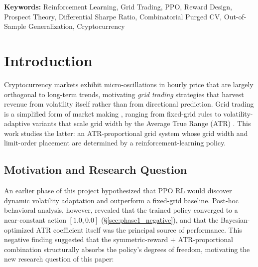 \documentclass[11pt, a4paper]{article}
\begin{document}
\begin{abstract}
Our contribution is twofold. First, we demonstrate quantitatively that reward
design exerts its effect through a \emph{trade-off dimension in risk profile}
rather than a single Sharpe ``alpha source.'' Second, we provide quantitative
evidence that Kahneman-Tversky prospect theory confers OOS safety on
RL trading policies. Code and data:
\url{https://github.com/cosmicpotato2047/capstone-rl-trading}.
\end{abstract}

\vspace{1em}
\noindent\textbf{Keywords:} Reinforcement Learning, Grid Trading, PPO,
Reward Design, Prospect Theory, Differential Sharpe Ratio,
Combinatorial Purged CV, Out-of-Sample Generalization, Cryptocurrency

\newpage
\tableofcontents
\newpage

\section{Introduction}
\label{sec:intro}

Cryptocurrency markets exhibit micro-oscillations in hourly price that are
largely orthogonal to long-term trends, motivating \emph{grid trading} strategies
that harvest revenue from volatility itself rather than from directional
prediction. Grid trading is a simplified form of market making
\citep{avellaneda2008market}, ranging from fixed-grid rules to volatility-adaptive
variants that scale grid width by the Average True Range (ATR)
\citep{wilder1978atr}. This work studies the latter: an ATR-proportional grid
system whose grid width and limit-order placement are determined by a
reinforcement-learning policy.

\subsection{Motivation and Research Question}
\label{sec:intro_motivation}

An earlier phase of this project hypothesized that PPO RL would discover dynamic
volatility adaptation and outperform a fixed-grid baseline. Post-hoc behavioral
analysis, however, revealed that the trained policy converged to a near-constant
action $[1.0, 0.0]$ (\S\ref{sec:phase1_negative}), and that the
Bayesian-optimized ATR coefficient itself was the principal source of
performance. This negative finding suggested that the symmetric-reward $+$
ATR-proportional combination structurally absorbs the policy's degrees of
freedom, motivating the new research question of this paper:
\end{document}
